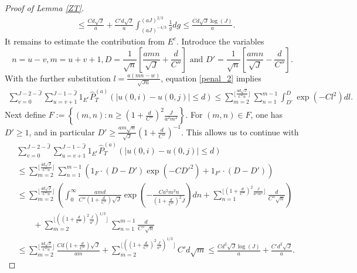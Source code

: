 \documentclass[12pt]{amsart}
\numberwithin{equation}{section}
\newcommand{\1}{\mathbf{1}}
\begin{document}
\begin{proof}[Proof of Lemma \ref{ZT}]
\begin{equation}
\begin{split}
        &\leq \frac{Cd\sqrt{J}}{a}+ \frac{C'd\sqrt{J}}{a}\int_{(aJ)^{-4/3}}^{(aJ)^{2/3}}\frac{1}{g}dg\leq\frac{Cd\sqrt{J}\log (J)}{a}.
    \end{split}
\end{equation}
It remains to estimate the contribution from $E^c$. Introduce the variables
\begin{equation*}
    n=u-v, m=u+v+1,D=\frac{1}{\sqrt{n}}\left[\frac{amn}{\sqrt{J}}+\frac{d}{C''}\right]\text{ and }D'=\frac{1}{\sqrt{n}}\left[\frac{amn}{\sqrt{J}}-\frac{d}{C''}\right].
\end{equation*}
With the further substitution $l=\frac{a(mn-w)}{\sqrt{Jn}}$, equation \eqref{penal_2} implies
\begin{equation*}
    \begin{split}
        \sum_{v=0}^{J-2-\hat{J}}\sum_{u=v+1}^{J-1-\hat{J}}1_{E^c}\widehat{P}_T^{(a)}(\vert u(0,i)-u(0,j)\vert\leq d)\leq\sum_{m=2}^{\lfloor\frac{4d\sqrt{J}}{C''a}\rfloor}\sum_{n=1}^{m-1}\int_{D'}^D\exp\left(-Cl^2\right)dl.
    \end{split}
\end{equation*}
Next define $F:=\left\lbrace (m,n):n\geq\left(1+\frac{d}{C''}\right)^2\frac{J}{a^2m^2}\right\rbrace$. For $(m,n)\in F$, one has $D'\ge 1$, and in particular $D'\geq\frac{am\sqrt{n}}{\sqrt{J}}(1+\frac{d}{C''})^{-1}$. This allows us to continue with
\begin{equation*}
    \begin{split}
        &\sum_{v=0}^{J-2-\hat{J}}\sum_{u=v+1}^{J-1-\hat{J}}1_{E^c}\widehat{P}_T^{(a)}(\vert u(0,i)-u(0,j)\vert\leq d)\\
        &\leq \sum_{m=2}^{\lfloor\frac{4d\sqrt{J}}{C''a}\rfloor}\sum_{n=1}^{m-1}\left(1_F\cdot(D-D')\exp\left(-CD'^2\right)+1_{F^c}\cdot(D-D')\right)\\
        &\leq \sum_{m=2}^{\lfloor\frac{4d\sqrt{J}}{C''a}\rfloor}\left(\int_{0}^{\infty}\frac{amd}{C''\left(1+\frac{d}{C''}\right)\sqrt{J}}\exp\left(-\frac{Ca^2m^2n}{\left(1+\frac{d}{C''}\right)^2J}\right)dn+\sum_{n=1}^{\lfloor\left(1+\frac{d}{C''}\right)^2\frac{J}{a^2m^2}\rfloor}\frac{d}{C''\sqrt{n}}\right)\\
        &\quad\quad +\sum_{m=2}^{\lfloor(\left(1+\frac{d}{C''}\right)^2\frac{J}{a^2})^{1/3}\rfloor}\sum_{n=1}^{m-1}\frac{d}{C''\sqrt{n}}\\
        &\leq \sum_{m=2}^{\lfloor\frac{4d\sqrt{J}}{C''a}\rfloor}\frac{Cd\left(1+\frac{d}{C''}\right)\sqrt{J}}{am} +\sum_{m=2}^{\lfloor(\left(1+\frac{d}{C''}\right)^2\frac{J}{a^2})^{1/3}\rfloor}C'd\sqrt{m}\leq \frac{Cd^2\sqrt{J}\log(J)}{a}+\frac{C'd^2\sqrt{J}}{a}.

\end{split}
\end{equation*}
\end{proof}
\end{document}
